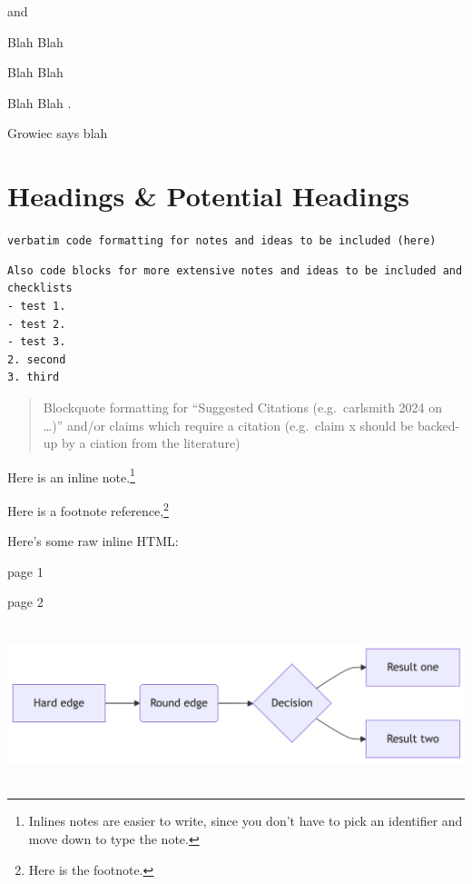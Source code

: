 \documentclass[12pt,a4paper]{report}
\begin{document}

\textcite{soares2014}

\autocite{soares2014} and \autocite{knuth1984}

Blah Blah \autocites[see][33-35]{knuth1984}[also][chap.~1]{growiec2024}

Blah Blah \autocite[33-35, 38-39 and passim]{knuth1984}

Blah Blah \autocite{growiec2024,knuth1984}.

Growiec says blah \autocite*{growiec2024}

\section{Headings \& Potential Headings}\label{sec-heading}

\texttt{verbatim\ code\ formatting\ for\ notes\ and\ ideas\ to\ be\ included\ (here)}

\begin{verbatim}
Also code blocks for more extensive notes and ideas to be included and checklists
- test 1. 
- test 2. 
- test 3.
2. second
3. third
\end{verbatim}

\begin{quote}
Blockquote formatting for ``Suggested Citations (e.g.~carlsmith 2024 on
\ldots)'' and/or claims which require a citation (e.g.~claim x should be
backed-up by a ciation from the literature)
\end{quote}

Here is an inline note.\footnote{Inlines notes are easier to write,
  since you don't have to pick an identifier and move down to type the
  note.}

Here is a footnote reference,\footnote{Here is the footnote.}

\renewcommand*{\labelitemi}{\textgreater}

Here's some raw inline HTML:

page 1

\newpage{}

page 2

\includegraphics[width=6.88in,height=1.81in]{ref/references_files/figure-latex/mermaid-figure-1.png}
\end{document}
